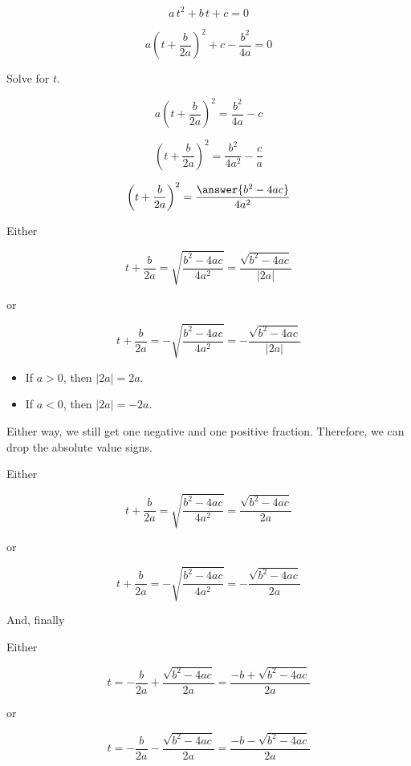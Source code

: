 \documentclass{ximera}
\begin{document}
\[ a \, t^2 + b \, t + c = 0 \]

\[ a\left(t + \frac{b}{2 a}\right)^2 + c - \frac{b^2}{4 a}  = 0\]

Solve for $t$.



\begin{explanation}
\[ a \left(t + \frac{b}{2 a} \right)^2  = \frac{b^2}{4 a} - c\]

\[ \left(t + \frac{b}{2 a} \right)^2  = \frac{b^2}{4 a^2} - \frac{c}{a}\]

\[ \left(t + \frac{b}{2 a} \right)^2  = \frac{\answer{b^2 - 4 a c}}{4 a^2} \]
\end{explanation}


Either 


\[ t + \frac{b}{2 a}  = \sqrt{\frac{b^2 - 4 a c}{4 a^2}}  = \frac{\sqrt{b^2 - 4 a c}}{| 2a |}   \]

or


\[ t + \frac{b}{2 a}  = -\sqrt{\frac{b^2 - 4 a c}{4 a^2}} = -\frac{\sqrt{b^2 - 4 a c}}{| 2a |}    \]



\begin{itemize}
\item If $a > 0$, then $| 2a | = 2a$.
\item If $a < 0$, then $| 2a | = -2a$.
\end{itemize}

Either way, we still get one negative and one positive fraction.  Therefore, we can drop the absolute value signs.  





Either 


\[ t + \frac{b}{2 a}  = \sqrt{\frac{b^2 - 4 a c}{4 a^2}}  = \frac{\sqrt{b^2 - 4 a c}}{2a}   \]

or


\[ t + \frac{b}{2 a}  = -\sqrt{\frac{b^2 - 4 a c}{4 a^2}} = -\frac{\sqrt{b^2 - 4 a c}}{2a}    \]










And, finally \\


\begin{conclusion}



Either 


\[ t   = - \frac{b}{2 a} + \frac{\sqrt{b^2 - 4 a c}}{2a}  = \frac{-b + \sqrt{b^2 - 4 a c}}{2a}      \]

or


\[ t  = - \frac{b}{2 a}  -\frac{\sqrt{b^2 - 4 a c}}{2a} =    \frac{-b - \sqrt{b^2 - 4 a c}}{2a}      \]

\end{conclusion}
\end{document}
